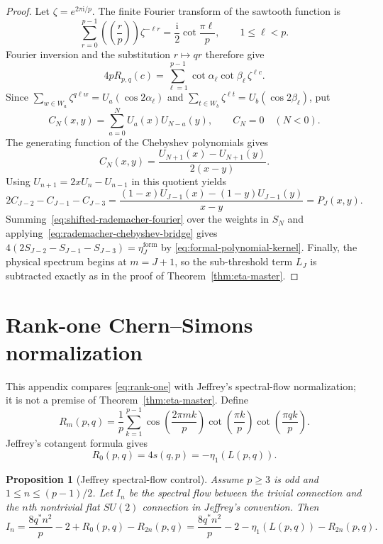 \documentclass[11pt]{article}
\newtheorem{proposition}[theorem]{Proposition}
\theoremstyle{definition}
\begin{document}
\begin{proof}
Let $\zeta=e^{2\pi\mathrm{i}/p}$.  The finite Fourier transform of the sawtooth
function is
\[
 \sum_{r=0}^{p-1}\left(\!\left(\frac rp\right)\!\right)
 \zeta^{-\ell r}=\frac{\mathrm{i}}{2}\cot\frac{\pi\ell}{p},
 \qquad 1\leq\ell<p.
\]
Fourier inversion and the substitution $r\mapsto qr$ therefore give
\begin{equation}\label{eq:shifted-rademacher-fourier}
 4pR_{p,q}(c)=\sum_{\ell=1}^{p-1}
 \cot\alpha_\ell\cot\beta_\ell\,\zeta^{\ell c}.
\end{equation}
Since
$\sum_{w\in W_a}\zeta^{q\ell w}=U_a(\cos2\alpha_\ell)$ and
$\sum_{t\in W_b}\zeta^{\ell t}=U_b(\cos2\beta_\ell)$, put
\[
 C_N(x,y)=\sum_{a=0}^N U_a(x)U_{N-a}(y),\qquad C_N=0\quad(N<0).
\]
The generating function of the Chebyshev polynomials gives
\[
 C_N(x,y)=\frac{U_{N+1}(x)-U_{N+1}(y)}{2(x-y)}.
\]
Using $U_{n+1}=2xU_n-U_{n-1}$ in this quotient yields
\begin{equation}\label{eq:rademacher-chebyshev-bridge}
 2C_{J-2}-C_{J-1}-C_{J-3}
 =\frac{(1-x)U_{J-1}(x)-(1-y)U_{J-1}(y)}{x-y}
 =P_J(x,y).
\end{equation}
Summing~\eqref{eq:shifted-rademacher-fourier} over the weights in $S_N$
and applying~\eqref{eq:rademacher-chebyshev-bridge} gives
$4(2S_{J-2}-S_{J-1}-S_{J-3})=\eta_J^{\mathrm{form}}$ by
\eqref{eq:formal-polynomial-kernel}.  Finally, the physical spectrum begins
at $m=J+1$, so the sub-threshold term $L_J$ is subtracted exactly as in the
proof of Theorem~\ref{thm:eta-master}.
\end{proof}

\section{Rank-one Chern--Simons normalization}
\label{app:jeffrey}

This appendix compares \eqref{eq:rank-one} with Jeffrey's spectral-flow
normalization; it is not a premise of Theorem~\ref{thm:eta-master}.
Define
\begin{equation}
 R_m(p,q)=\frac1p\sum_{k=1}^{p-1}
 \cos\left(\frac{2\pi mk}{p}\right)
 \cot\left(\frac{\pi k}{p}\right)
 \cot\left(\frac{\pi qk}{p}\right).
 \label{eq:Rm-jeffrey}
\end{equation}
Jeffrey's cotangent formula gives
\[
 R_0(p,q)=4s(q,p)=-\eta_1(L(p,q)).
\]

\begin{proposition}[Jeffrey spectral-flow control]
\label{prop:j1-cs-control}
Assume $p\geq3$ is odd and $1\leq n\leq(p-1)/2$.  Let $I_n$ be the spectral
flow between the trivial connection and the $n$th nontrivial flat $SU(2)$
connection in Jeffrey's convention.  Then
\begin{equation}
 I_n=\frac{8q^*n^2}{p}-2+R_0(p,q)-R_{2n}(p,q)
 =\frac{8q^*n^2}{p}-2-\eta_1(L(p,q))-R_{2n}(p,q).
 \label{eq:jeffrey-flow}
\end{equation}
\end{proposition}
\end{document}
